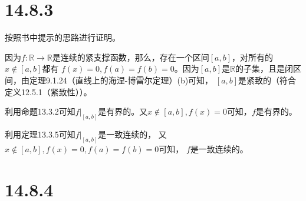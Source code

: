 \documentclass{article}
\begin{document}
\section*{14.8.3}

按照书中提示的思路进行证明。

因为$f: \mathbb{R} \to \mathbb{R}$是连续的紧支撑函数，那么，存在一个区间$[a, b]$，对所有的$x \notin [a,b]$都有
$f(x) = 0, f(a) = f(b) = 0$。因为$[a,b]$是$\mathbb{R}$的子集，且是闭区间，由定理9.1.24（直线上的海涅-博雷尔定理）(b)可知，
$[a, b]$是紧致的（符合定义12.5.1（紧致性））。

利用命题13.3.2可知$f|_{[a,b]}$是有界的。又$x \notin [a, b], f(x) = 0$可知，$f$是有界的。

利用定理13.3.5可知$f|_{[a,b]}$是一致连续的，
又$x \notin [a, b], f(x) = 0, f(a)=f(b)=0$可知，
$f$是一致连续的。

\section*{14.8.4}
\end{document}
